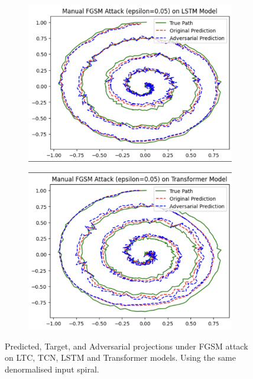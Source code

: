 \begin{figure}[H]
\begin{subfigure}[b]{0.45\linewidth}
        \includegraphics[width=\linewidth]{img/fgsm_spiral_lstm.png}
        \label{fig:fgsm_spiral_lstm}
    \end{subfigure}
    \hfill
    \begin{subfigure}[b]{0.45\linewidth}
        \includegraphics[width=\linewidth]{img/fgsm_spiral_transformer.png}
        \label{fig:fgsm_spiral_transformer}
    \end{subfigure}
    \caption{Predicted, Target, and Adversarial projections under FGSM attack on LTC, TCN, LSTM and Transformer models. Using the same denormalised input spiral.}
    \label{fig:fsgm_spirals}
\end{figure}

